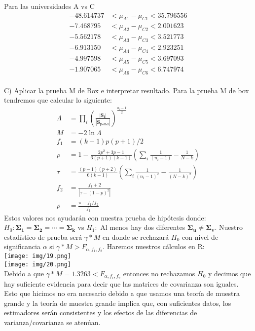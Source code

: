\begin{sol}
Para las universidades A vs C
\begin{align*}
-48.614737 &< \mu_{A1} - \mu_{C1} < 35.796556 \\
-7.468795 &< \mu_{A2} - \mu_{C2} < 2.001623 \\
-5.562178 &< \mu_{A3} - \mu_{C3} < 3.521773 \\
-6.913150 &< \mu_{A4} - \mu_{C4} < 2.923251 \\
-4.997598 &< \mu_{A5} - \mu_{C5} < 3.697093 \\
-1.907065 &< \mu_{A6} - \mu_{C6} < 6.747974 \\
\end{align*}

\pagebreak
C) Aplicar la prueba M de Box e interpretar resultado.
Para la prueba M de box tendremos que calcular lo siguiente:
\begin{align*}
\Lambda &= \prod_{i}(\frac{|\bm{S_i}|}{|\bm{S_{pond}}|})^{\frac{n_i-1}{2}}  \\
M &= -2\ln{\Lambda}\\
f_1 &= (k-1)p(p+1)/2\\
\rho &= 1- \frac{2p^2+3p-1}{6(p+1)(k-1)}(\sum_i\frac{1}{(n_i-1)}-\frac{1}{N-k})\\
\tau &= \frac{(p-1)(p+2)}{6(k-1)}(\sum_i\frac{1}{(n_i-1)^2}-\frac{1}{(N-k)^2})\\
f_2 &= \frac{f_1+2}{|\tau-(1-p)^2|}\\
\rho &= \frac{\pi-f_1/f_2}{f_1}
\end{align*}
Estos valores nos ayudarán con nuestra prueba de hipótesis donde: $H_0:\bm{\Sigma_1=\Sigma_2=\cdots = \Sigma_k}$ vs $H_1:$ Al menos hay dos diferentes $\bm{\Sigma_u} \neq \bm{\Sigma_v}$. Nuestro estadístico de prueba será $\gamma* M$ en donde se rechazará $H_0$ con nivel de significancia $\alpha$ si $\gamma*M>F_{\alpha,f_1,f_2}$. Haremos nuestros cálculos en R:\\
\texttt{[image: img/19.png]}\\
\texttt{[image: img/20.png]}\\
Debido a que $\gamma* M = 1.3263 < F_{\alpha,f_1,f_2}$ entonces no rechazamos $H_0$ y decimos que hay suficiente evidencia para decir que las matrices de covarianza son iguales. Esto que hicimos no era necesario debido a que usamos una teoría de muestra grande y la teoría de muestra grande implica que, con suficientes datos, los estimadores serán consistentes y los efectos de las diferencias de varianza/covarianza se atenúan. 
\end{sol}